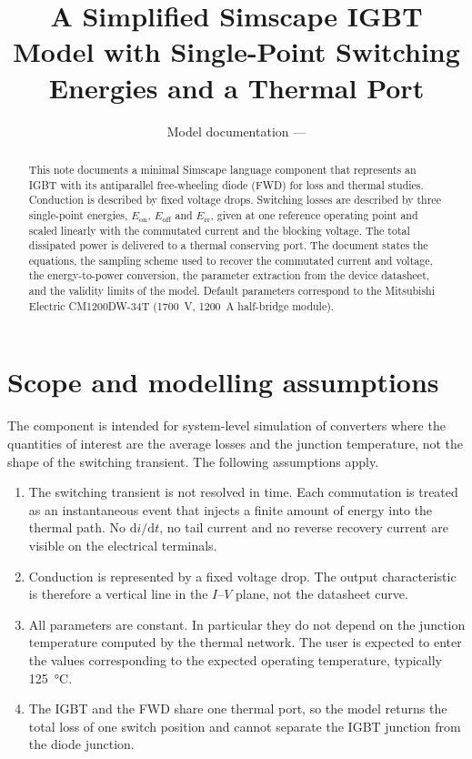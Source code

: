 \documentclass[11pt,a4paper]{article}
\title{A Simplified Simscape IGBT Model with Single-Point Switching
Energies and a Thermal Port}
\author{Model documentation --- \code{igbt\_simple.ssc}}
\date{}
\begin{document}
\maketitle

\begin{abstract}
\noindent
This note documents a minimal Simscape language component that represents an
IGBT with its antiparallel free-wheeling diode (FWD) for loss and thermal
studies. Conduction is described by fixed voltage drops. Switching losses are
described by three single-point energies, $E_\mathrm{on}$, $E_\mathrm{off}$ and
$E_\mathrm{rr}$, given at one reference operating point and scaled linearly with
the commutated current and the blocking voltage. The total dissipated power is
delivered to a thermal conserving port. The document states the equations, the
sampling scheme used to recover the commutated current and voltage, the
energy-to-power conversion, the parameter extraction from the device datasheet,
and the validity limits of the model. Default parameters correspond to the
Mitsubishi Electric CM1200DW-34T (\SI{1700}{\volt}, \SI{1200}{\ampere}
half-bridge module).
\end{abstract}

\section{Scope and modelling assumptions}

The component is intended for system-level simulation of converters where the
quantities of interest are the average losses and the junction temperature, not
the shape of the switching transient. The following assumptions apply.

\begin{enumerate}
  \item The switching transient is not resolved in time. Each commutation is
        treated as an instantaneous event that injects a finite amount of energy
        into the thermal path. No $\mathrm{d}i/\mathrm{d}t$, no tail current and
        no reverse recovery current are visible on the electrical terminals.
  \item Conduction is represented by a fixed voltage drop. The output
        characteristic is therefore a vertical line in the $I$--$V$ plane, not
        the datasheet curve.
  \item All parameters are constant. In particular they do not depend on the
        junction temperature computed by the thermal network. The user is
        expected to enter the values corresponding to the expected operating
        temperature, typically \SI{125}{\degreeCelsius}.
  \item The IGBT and the FWD share one thermal port, so the model returns the
        total loss of one switch position and cannot separate the IGBT junction
        from the diode junction.
\end{enumerate}
\end{document}
